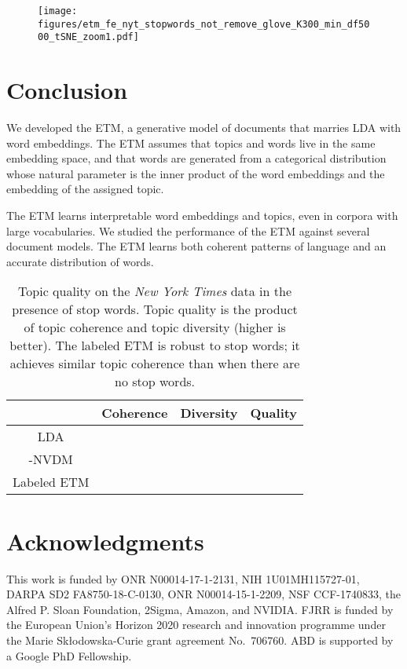 \documentclass[11pt,a4paper]{article}
\begin{document}
\begin{figure}[t]
 \centering
 \texttt{[image: figures/etm\_fe\_nyt\_stopwords\_not\_remove\_glove\_K300\_min\_df5000\_tSNE\_zoom1.pdf]}
 \label{fig:topic_embedding_stops}
\end{figure}




 \section{Conclusion}
\label{sec:conclusion}

We developed the \gls{ETM}, a generative model of documents that
marries \gls{LDA} with word embeddings. The \gls{ETM} assumes that
topics and words live in the same embedding space, and that words are
generated from a categorical distribution whose natural parameter is
the inner product of the word embeddings and the embedding of the
assigned topic.

The \gls{ETM} learns interpretable word embeddings and topics, even in
corpora with large vocabularies. We studied the performance of the
\gls{ETM} against several document models. The \gls{ETM} learns both
coherent patterns of language and an accurate distribution of words.

\begin{table}[t]
  \centering
  \caption{Topic quality on the \emph{New York Times} data in the
    presence of stop words. Topic quality is the
    product of topic coherence and topic diversity (higher is
    better). The labeled \gls{ETM} is robust to stop words; it achieves
    similar topic coherence than when there are no stop words.
    \label{tab:tc_td_stopwords}}
  {\small
    \begin{tabular}{cccc} \toprule
      & Coherence  &  Diversity  & Quality\\ \midrule
      \acrshort{LDA}           &   &  &   \\
            -\acrshort{NVDM} &           &       &     \\
      Labeled \acrshort{ETM}    &  &  & \\ \bottomrule
    \end{tabular}}
\end{table}




 

\section*{Acknowledgments}
This work is funded by ONR N00014-17-1-2131, NIH 1U01MH115727-01, DARPA SD2 FA8750-18-C-0130, ONR N00014-15-1-2209, NSF CCF-1740833, the Alfred P. Sloan Foundation, 2Sigma, Amazon, and NVIDIA. FJRR is funded by the European Union's Horizon 2020 research and innovation programme under the Marie Sk\l{}odowska-Curie grant agreement No.\ 706760. 
ABD is supported by a Google PhD Fellowship.



\end{document}
